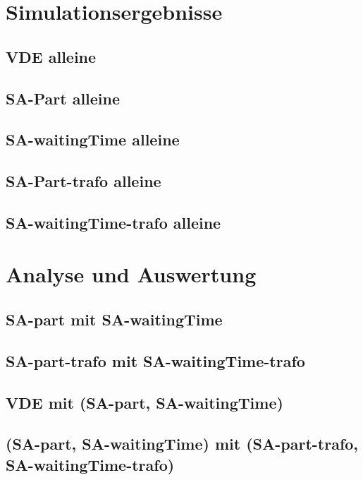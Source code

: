 \section{Simulationsergebnisse}
\subsection{VDE alleine}
\subsection{SA-Part alleine}
\subsection{SA-waitingTime alleine}
\subsection{SA-Part-trafo alleine}
\subsection{SA-waitingTime-trafo alleine}
\section{Analyse und Auswertung}
\subsection{SA-part mit SA-waitingTime}
\subsection{SA-part-trafo mit SA-waitingTime-trafo}
\subsection{VDE mit (SA-part, SA-waitingTime)}
\subsection{(SA-part, SA-waitingTime) mit (SA-part-trafo, SA-waitingTime-trafo)}
